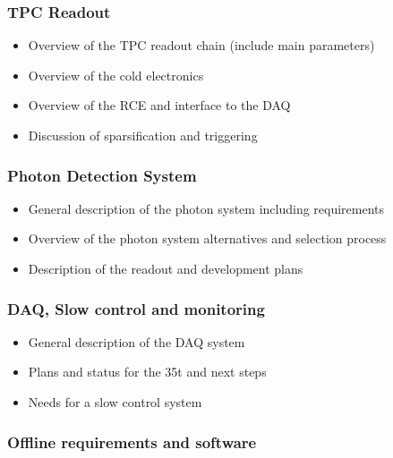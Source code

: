 \subsubsection{TPC Readout}

\begin{itemize}
\item Overview of the TPC readout chain (include main parameters)
\item Overview of the cold electronics
\item Overview of the RCE and interface to the DAQ
\item	Discussion of sparsification and triggering
\end{itemize}

\subsubsection{Photon Detection System}
\begin{itemize}
\item General description of the photon system including requirements
\item Overview of the photon system alternatives and selection process
\item Description of the readout and development plans
\end{itemize}

\subsubsection{DAQ, Slow control and monitoring}

\begin{itemize}
\item General description of the DAQ system
\item Plans and status for the 35t and next steps
\item Needs for a slow control system
\end{itemize}

\subsubsection{Offline requirements and software}



